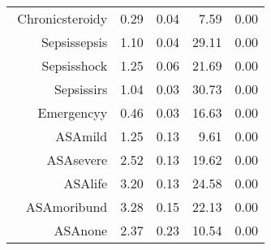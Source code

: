 \begin{tabular}{rrrrr}
$$  Chronic\-steroid\-y & 0.29 & 0.04 & 7.59 & 0.00 \\ 
  Sepsis\-sepsis & 1.10 & 0.04 & 29.11 & 0.00 \\ 
  Sepsis\-shock & 1.25 & 0.06 & 21.69 & 0.00 \\ 
  Sepsis\-sirs & 1.04 & 0.03 & 30.73 & 0.00 \\ 
  Emergency\-y & 0.46 & 0.03 & 16.63 & 0.00 \\ 
  ASA\-mild & 1.25 & 0.13 & 9.61 & 0.00 \\ 
  ASA\-severe & 2.52 & 0.13 & 19.62 & 0.00 \\ 
  ASA\-life & 3.20 & 0.13 & 24.58 & 0.00 \\ 
  ASA\-moribund & 3.28 & 0.15 & 22.13 & 0.00 \\ 
  ASA\-none & 2.37 & 0.23 & 10.54 & 0.00 \\ 
   \hline
\end{tabular}

